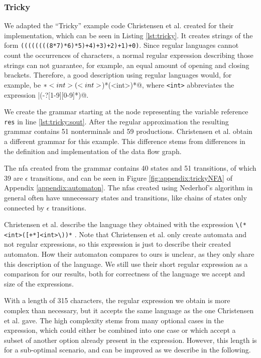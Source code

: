 \subsubsection{Tricky}\label{sec:eval:quality:tricky}

We adapted the \enquote{Tricky} example code Christensen et al. \cite{brics} created for their implementation, which can be seen in Listing \ref{lst:tricky}. It creates strings of the form \lstinline|((((((((8*7)*6)*5)+4)+3)+2)+1)+0)|. Since regular languages cannot count the occurrences of characters, a normal regular expression describing those strings can not guarantee, for example, an equal amount of opening and closing brackets. Therefore, a good description using regular languages would, for example, be \Verb@\(*<int>(\*<int>\))*(\+<int>\))*@, where \Verb|<int>| abbreviates the expression |(-?[1-9][0-9]*)@.

We create the grammar starting at the node representing the variable reference \lstinline|res| in line \ref{lst:tricky:sout}.
After the regular approximation the resulting grammar contains 51 nonterminals and 59 productions.
Christensen et al. obtain a different grammar for this example. This difference stems from differences in the definition and implementation of the data flow graph.

The \ac{nfa} created from the grammar contains 40 states and 51 transitions, of which 39 are $\epsilon$ transitions, and can be seen in Figure \ref{fig:appendix:trickyNFA} of Appendix \ref{appendix:automaton}.
The \acp{nfa} created using Nederhof's algorithm in general often have unnecessary states and transitions, like chains of states only connected by $\epsilon$ transitions.

Christensen et al. describe the language they obtained with the expression \Verb|\(*<int>([+*]<int>\))*| \cite{brics}. Note that Christensen et al. only create automata and not regular expressions, so this expression is just to describe their created automaton. How their automaton compares to ours is unclear, as they only share this description of the language. We still use  their short regular expression as a comparison for our results, both for correctness of the language we accept and size of the expressions.

With a length of 315 characters, the regular expression we obtain is more complex than necessary, but it accepts the same language as the one Christensen et al. gave. 
The high complexity stems from many optional cases in the expression, which could either be combined into one case or which accept a subset of another option already present in the expression.
However, this length is for a sub-optimal scenario, and can be improved as we describe in the following.

